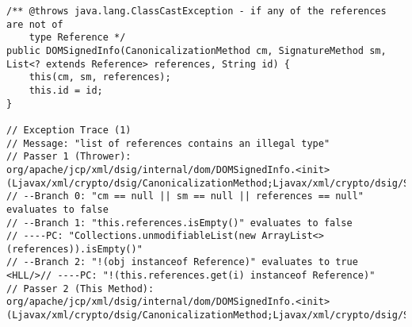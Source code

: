 \begin{lstlisting}[language=java-pretty]
/** @throws java.lang.ClassCastException - if any of the references are not of
    type Reference */
public DOMSignedInfo(CanonicalizationMethod cm, SignatureMethod sm, List<? extends Reference> references, String id) {
    this(cm, sm, references);
    this.id = id;
}

// Exception Trace (1)
// Message: "list of references contains an illegal type"
// Passer 1 (Thrower): org/apache/jcp/xml/dsig/internal/dom/DOMSignedInfo.<init>(Ljavax/xml/crypto/dsig/CanonicalizationMethod;Ljavax/xml/crypto/dsig/SignatureMethod;Ljava/util/List;)
// --Branch 0: "cm == null || sm == null || references == null" evaluates to false
// --Branch 1: "this.references.isEmpty()" evaluates to false
// ----PC: "Collections.unmodifiableList(new ArrayList<>(references)).isEmpty()"
// --Branch 2: "!(obj instanceof Reference)" evaluates to true
<HLL/>// ----PC: "!(this.references.get(i) instanceof Reference)"
// Passer 2 (This Method): org/apache/jcp/xml/dsig/internal/dom/DOMSignedInfo.<init>(Ljavax/xml/crypto/dsig/CanonicalizationMethod;Ljavax/xml/crypto/dsig/SignatureMethod;Ljava/util/List;Ljava/lang/String;)
\end{lstlisting}








